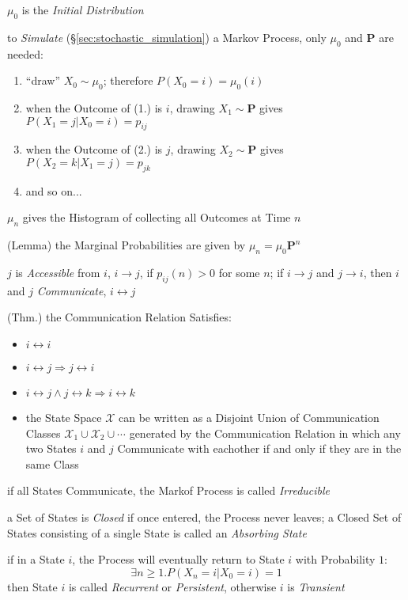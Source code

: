 $\mu_0$ is the \emph{Initial Distribution}

to \emph{Simulate} (\S\ref{sec:stochastic_simulation}) a Markov Process, only
$\mu_0$ and $\mathbf{P}$ are needed:
\begin{enumerate}
  \item ``draw'' $X_0 \sim \mu_0$; therefore $P(X_0 = i) = \mu_0(i)$
  \item when the Outcome of (1.) is $i$, drawing $X_1 \sim \mathbf{P}$ gives
    $P(X_1 = j | X_0 = i) = p_{ij}$
  \item when the Outcome of (2.) is $j$, drawing $X_2 \sim \mathbf{P}$ gives
    $P(X_2 = k | X_1 = j) = p_{jk}$
  \item and so on...
\end{enumerate}

$\mu_n$ gives the Histogram of collecting all Outcomes at Time $n$

(Lemma) the Marginal Probabilities are given by $\mu_n = \mu_0 \mathbf{P}^n$

$j$ is \emph{Accessible} from $i$, $i \rightarrow j$, if $p_{ij}(n) > 0$ for
some $n$; if $i \rightarrow j$ and $j \rightarrow i$, then $i$ and $j$
\emph{Communicate}, $i \leftrightarrow j$

(Thm.) the Communication Relation Satisfies:
\begin{itemize}
  \item $i \leftrightarrow i$
  \item $i \leftrightarrow j \Longrightarrow j \leftrightarrow i$
  \item $i \leftrightarrow j \wedge j \leftrightarrow k \Longrightarrow
    i \leftrightarrow k$
  \item the State Space $\mathcal{X}$ can be written as a Disjoint Union of
    Communication Classes $\mathcal{X}_1 \cup \mathcal{X}_2 \cup \cdots$
    generated by the Communication Relation in which any two States $i$ and $j$
    Communicate with eachother if and only if they are in the same Class
\end{itemize}

if all States Communicate, the Markof Process is called \emph{Irreducible}

a Set of States is \emph{Closed} if once entered, the Process never leaves; a
Closed Set of States consisting of a single State is called an \emph{Absorbing
  State}

if in a State $i$, the Process will eventually return to State $i$ with
Probability $1$:
\[
  \exists n \geq 1 . P(X_n = i | X_0 = i) = 1
\]
then State $i$ is called \emph{Recurrent} or \emph{Persistent}, otherwise $i$ is
\emph{Transient}

